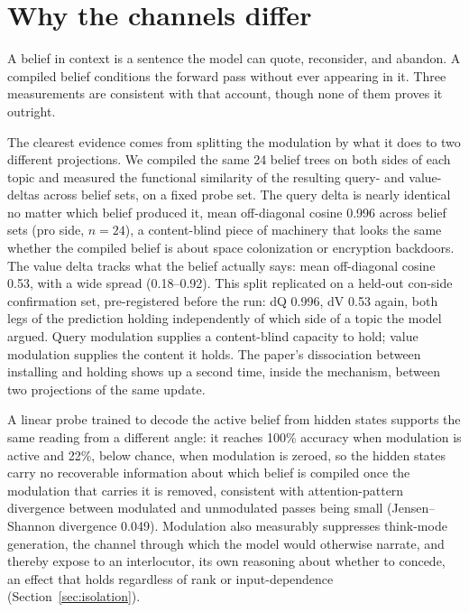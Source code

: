 \section{Why the channels differ}
\label{sec:why-channels-differ}

A belief in context is a sentence the model can quote, reconsider, and abandon. A
compiled belief conditions the forward pass without ever appearing in it. Three
measurements are consistent with that account, though none of them proves it outright.

The clearest evidence comes from splitting the modulation by what it does to two
different projections. We compiled the same 24 belief trees on both sides of each
topic and measured the functional similarity of the resulting query- and value-deltas
across belief sets, on a fixed probe set. The query delta is nearly identical no matter
which belief produced it, mean off-diagonal cosine 0.996 across belief sets (pro side,
\(n=24\)), a content-blind piece of machinery that looks the same whether the compiled
belief is about space colonization or encryption backdoors. The value delta tracks what
the belief actually says: mean off-diagonal cosine 0.53, with a wide spread
(0.18--0.92). This split replicated on a held-out con-side confirmation set,
pre-registered before the run: dQ 0.996, dV 0.53 again, both legs of the prediction
holding independently of which side of a topic the model
argued. Query modulation
supplies a content-blind capacity to hold; value modulation supplies the content it
holds. The paper's dissociation between installing and holding shows up a second time,
inside the mechanism, between two projections of the same update.

A linear probe trained to decode the active belief from hidden states supports the same
reading from a different angle: it reaches 100\% accuracy when modulation is active and
22\%, below chance, when modulation is zeroed, so the hidden states carry no
recoverable information about which belief is compiled once the modulation that
carries it is removed, consistent with attention-pattern divergence between modulated
and unmodulated passes being small (Jensen--Shannon divergence 0.049). Modulation also
measurably suppresses think-mode generation, the channel through which the model would
otherwise narrate, and thereby expose to an interlocutor, its own reasoning about
whether to concede, an effect that holds regardless of rank or
input-dependence\iflongversion{} (Section~\ref{sec:isolation})\fi.

